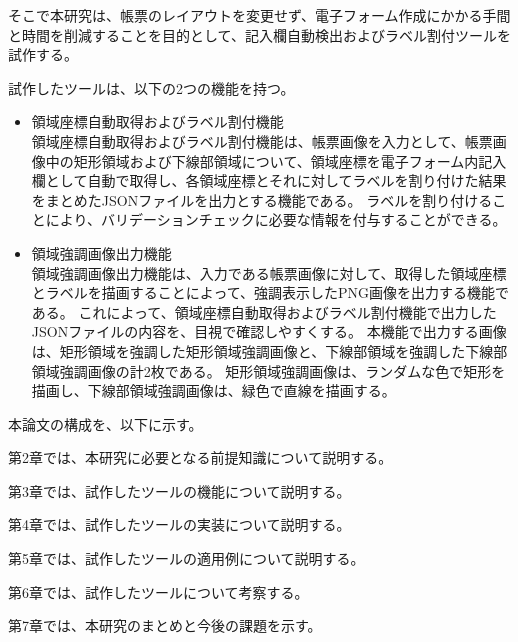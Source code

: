 そこで本研究は、帳票のレイアウトを変更せず、電子フォーム作成にかかる手間と時間を削減することを目的として、記入欄自動検出およびラベル割付ツールを試作する。


試作したツールは、以下の2つの機能を持つ。

\begin{itemize}
  \item 領域座標自動取得およびラベル割付機能\\
      領域座標自動取得およびラベル割付機能は、帳票画像を入力として、帳票画像中の矩形領域および下線部領域について、領域座標を電子フォーム内記入欄として自動で取得し、各領域座標とそれに対してラベルを割り付けた結果をまとめたJSONファイルを出力とする機能である。
      ラベルを割り付けることにより、バリデーションチェックに必要な情報を付与することができる。
  \item 領域強調画像出力機能\\
      領域強調画像出力機能は、入力である帳票画像に対して、取得した領域座標とラベルを描画することによって、強調表示したPNG画像を出力する機能である。
      これによって、領域座標自動取得およびラベル割付機能で出力したJSONファイルの内容を、目視で確認しやすくする。
      本機能で出力する画像は、矩形領域を強調した矩形領域強調画像と、下線部領域を強調した下線部領域強調画像の計2枚である。
      矩形領域強調画像は、ランダムな色で矩形を描画し、下線部領域強調画像は、緑色で直線を描画する。
\end{itemize}

本論文の構成を、以下に示す。\par
第2章では、本研究に必要となる前提知識について説明する。\par
第3章では、試作したツールの機能について説明する。\par
第4章では、試作したツールの実装について説明する。\par
第5章では、試作したツールの適用例について説明する。\par
第6章では、試作したツールについて考察する。\par
第7章では、本研究のまとめと今後の課題を示す。